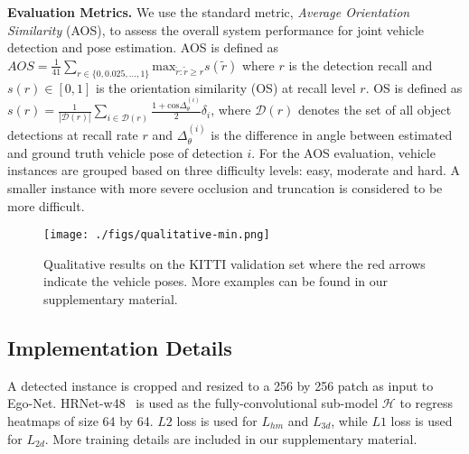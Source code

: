 \documentclass[final]{cvpr}
\begin{document}
\noindent\textbf{Evaluation Metrics.} We use the standard metric, \emph{Average Orientation Similarity} (AOS), to assess the overall system performance for joint vehicle detection and pose estimation. AOS is defined as $AOS = \frac{1}{41}\sum_{r\in\{0, 0.025, \dots, 1\}}\text{max}_{\tilde{r}:\tilde{r}\geq r}s(\tilde{r})$ where $r$ is the detection recall and $s(r) \in [0, 1]$ is the orientation similarity (OS) at recall level $r$. OS is defined as $s(r) = \frac{1}{|\mathcal{D}(r)|}\sum_{i \in \mathcal{D}(r)}\frac{1 + \text{cos}\Delta^{(i)}_{\theta}}{2}\delta_{i}$, where $\mathcal{D}(r)$ denotes the set of all object detections at recall rate $r$ and $\Delta^{(i)}_{\theta}$ is the difference in angle between estimated and ground truth vehicle pose of detection $i$. For the AOS evaluation, vehicle instances are grouped based on three difficulty levels: easy, moderate and hard. A smaller instance with more severe occlusion and truncation is considered to be more difficult.
\begin{figure*}[t]
	\begin{center}
		\texttt{[image: ./figs/qualitative-min.png]}
	\end{center}
	\caption{Qualitative results on the KITTI validation set where the red arrows indicate the vehicle poses. More examples can be found in our supplementary material.}
	\label{fig:qualitative}
\end{figure*}
\subsection{Implementation Details} 
A detected instance is cropped and resized to a 256 by 256 patch as input to Ego-Net. HRNet-w48~\cite{sun2019deep, wang2020deep} is used as the fully-convolutional sub-model $\mathcal{H}$ to regress heatmaps of size 64 by 64. $L2$ loss is used for $L_{hm}$ and $L_{3d}$, while $L1$ loss is used for $L_{2d}$. More training details are included in our supplementary material.
\end{document}
